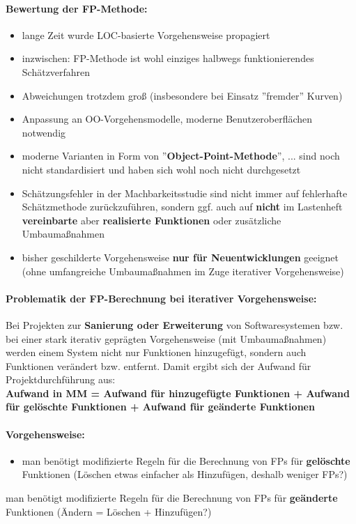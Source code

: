 \paragraph{Bewertung der FP-Methode:}

\begin{itemize}
	\item lange Zeit wurde LOC-basierte Vorgehensweise propagiert
	\item inzwischen: FP-Methode ist wohl einziges halbwegs funktionierendes Schätzverfahren
	\item Abweichungen trotzdem groß (insbesondere bei Einsatz ''fremder'' Kurven)
	\item Anpassung an OO-Vorgehensmodelle, moderne Benutzeroberflächen notwendig
	\item moderne Varianten in Form von ''\textbf{Object-Point-Methode}'', ... sind noch nicht standardisiert und haben sich wohl noch nicht durchgesetzt
	\item Schätzungsfehler in der Machbarkeitsstudie sind nicht immer auf fehlerhafte Schätzmethode zurückzuführen, sondern ggf. auch auf \textbf{nicht} im Lastenheft \textbf{vereinbarte} aber \textbf{realisierte Funktionen} oder zusätzliche Umbaumaßnahmen
	\item bisher geschilderte Vorgehensweise \textbf{nur für Neuentwicklungen} geeignet (ohne umfangreiche Umbaumaßnahmen im Zuge iterativer Vorgehensweise)
\end{itemize}

\paragraph{Problematik der FP-Berechnung bei iterativer Vorgehensweise:}
Bei Projekten zur \textbf{Sanierung oder Erweiterung} von Softwaresystemen bzw. bei einer stark iterativ geprägten Vorgehensweise (mit Umbaumaßnahmen) werden einem System nicht nur Funktionen hinzugefügt, sondern auch Funktionen verändert bzw. entfernt. Damit ergibt sich der Aufwand für Projektdurchführung aus: \\
\textbf{Aufwand in MM = Aufwand für hinzugefügte Funktionen + Aufwand für gelöschte Funktionen + Aufwand für geänderte Funktionen}

\paragraph{Vorgehensweise:}
\begin{itemize}
	\item man benötigt modifizierte Regeln für die Berechnung von FPs für \textbf{gelöschte} Funktionen (Löschen etwas einfacher als Hinzufügen, deshalb weniger FPs?)
\end{itemize}
man benötigt modifizierte Regeln für die Berechnung von FPs für \textbf{geänderte} Funktionen (Ändern = Löschen + Hinzufügen?)
